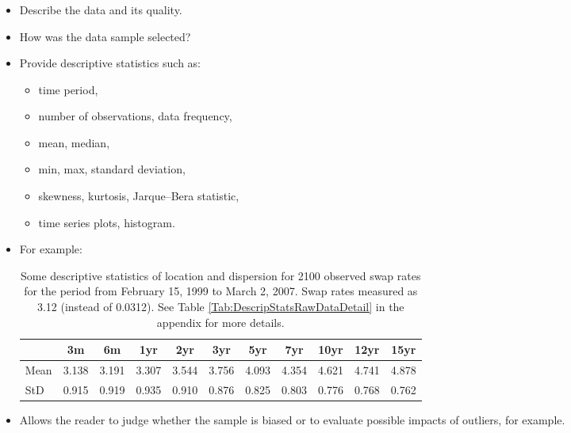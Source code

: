 \subsubsection{}




\begin{itemize}

    \item Describe the data and its quality.
    \item How was the data sample selected?
    \item Provide descriptive statistics such as:
        \begin{itemize}
            \item time period,
            \item number of observations, data frequency,
            \item mean, median,
            \item min, max, standard deviation,
            \item skewness, kurtosis, Jarque--Bera statistic,
            \item time series plots, histogram.
        \end{itemize}
    \item For example:
        \begin{table}[ht]

        \begin{center}
            {\footnotesize
            \begin{tabular}{l|cccccccccc}
                \hline \hline
                           & 3m    & 6m    & 1yr   & 2yr   & 3yr   & 5yr   & 7yr   & 10yr  & 12yr  & 15yr   \\
                \hline
                    Mean   & 3.138 & 3.191 & 3.307 & 3.544 & 3.756 & 4.093 & 4.354 & 4.621 & 4.741 & 4.878  \\
                    StD    & 0.915 & 0.919 & 0.935 & 0.910 & 0.876 & 0.825 & 0.803 & 0.776 & 0.768 & 0.762  \\
                \hline \hline
            \end{tabular}}
        \end{center}
        \caption{Some descriptive statistics of location and dispersion for
        2100 observed swap rates for the period from February 15, 1999
        to March 2, 2007. Swap rates measured as 3.12 (instead of 0.0312). See Table
        \ref{Tab:DescripStatsRawDataDetail} in the appendix for
        more details.}
        \label{Tab:DescripStatsRawData}
        \end{table}

    \item Allows the reader to judge whether the sample is biased or to evaluate possible impacts of outliers, for
    example.

\end{itemize}
